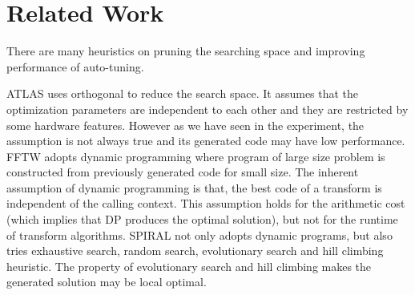 \section{Related Work}
\label{sec:related}

There are many heuristics on pruning the searching space and improving performance of auto-tuning.

ATLAS\cite{yotov2005search} uses orthogonal to reduce the search space. It assumes that 
the optimization parameters are independent to each other and they are restricted by some hardware features.
However as we have seen in the experiment, the assumption is not always true and its generated code
may have low performance. FFTW\cite{frigo2005design} adopts dynamic programming where program of large size problem
is constructed from previously generated code for small size. The inherent assumption of dynamic programming is that,
the best code of a transform is independent of the calling context. This assumption holds for the arithmetic cost (which implies
that DP produces the optimal solution), but not for the runtime of transform algorithms.
SPIRAL\cite{puschel2005spiral} not only adopts dynamic programs,
but also tries exhaustive search, random search, evolutionary search and hill climbing heuristic. The property 
of evolutionary search and hill climbing makes the generated solution may be local optimal.




